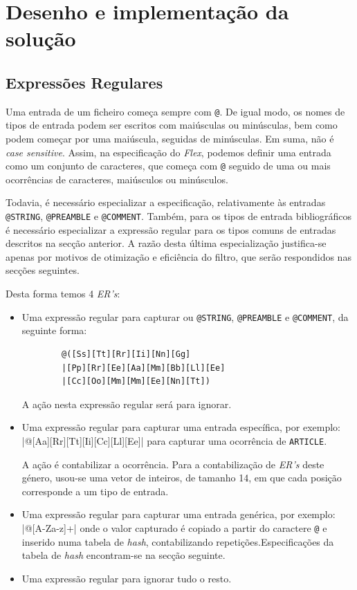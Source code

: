 \section{Desenho e implementação da solução}
\label{sec:des:a}

\subsection{Expressões Regulares}
Uma entrada de um ficheiro  começa sempre com \texttt{@}. De
igual modo, os nomes de tipos de entrada podem ser escritos com maiúsculas ou
minúsculas, bem como podem começar por uma maiúscula, seguidas de minúsculas. Em
suma, não é \emph{case sensitive}. Assim, na especificação do \emph{Flex},
podemos definir uma entrada como um conjunto de caracteres, que começa com
\texttt{@} seguido de uma ou mais ocorrências de caracteres, maiúsculos ou
minúsculos.

Todavia, é necessário especializar a especificação, relativamente às entradas
\texttt{@STRING}, \texttt{@PREAMBLE} e \texttt{@COMMENT}. Também, para os tipos
de entrada bibliográficos é necessário especializar a expressão regular para os
tipos comuns de entradas descritos na secção anterior. A razão desta última
especialização justifica-se apenas por motivos de otimização e eficiência do
filtro, que serão respondidos nas secções seguintes. 

Desta forma temos 4 \emph{ER's}:

\begin{itemize}
	\item Uma expressão regular para capturar ou \texttt{@STRING},
		\texttt{@PREAMBLE} e \texttt{@COMMENT}, da seguinte forma:
\begin{verbatim}
		@([Ss][Tt][Rr][Ii][Nn][Gg]
		|[Pp][Rr][Ee][Aa][Mm][Bb][Ll][Ee]
		|[Cc][Oo][Mm][Mm][Ee][Nn][Tt])
\end{verbatim}

A ação nesta expressão regular será para ignorar.


	\item Uma expressão regular para capturar uma entrada específica, por exemplo:
		|@[Aa][Rr][Tt][Ii][Cc][Ll][Ee]| para capturar uma ocorrência de
		\texttt{ARTICLE}.

		A ação é contabilizar a ocorrência. Para a contabilização de \emph{ER's}
		deste género, usou-se uma vetor de inteiros, de tamanho 14, em que cada
		posição corresponde a um tipo de entrada.
\newpage

	\item Uma expressão regular para capturar uma entrada genérica, por exemplo:
		|@[A-Za-z]+| onde o valor capturado é copiado a partir do
		caractere \texttt{@} e inserido numa tabela de
		\emph{hash}, contabilizando repetições.Especificações da tabela de
			\emph{hash} encontram-se na secção seguinte.
	\item Uma expressão regular para ignorar tudo o resto.

\end{itemize}


